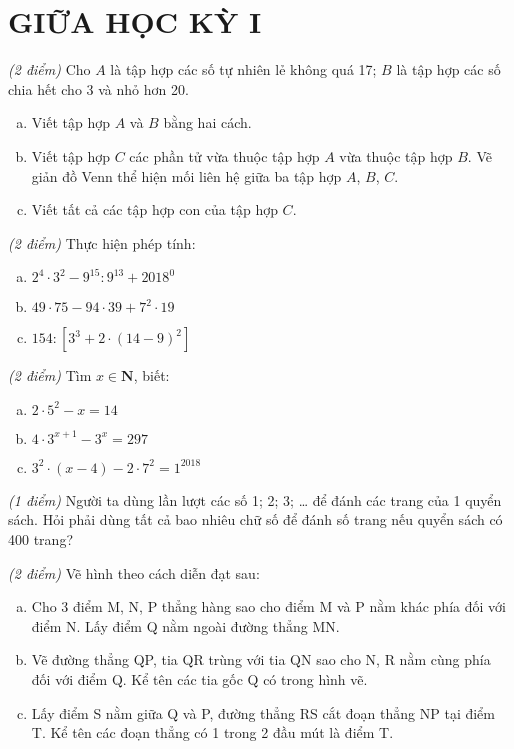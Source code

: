\section{GIỮA HỌC KỲ I}
\setcounter{ex}{0}
\begin{ex}  \textit{(2 điểm)} Cho $A$ là tập hợp các số tự nhiên lẻ không quá 17; $B$  là tập hợp các số chia hết cho 3 và nhỏ hơn 20.
\begin{enumerate} [a)]
\item Viết tập hợp $A$ và $B$ bằng hai cách.
\item Viết tập hợp $C$ các phần tử vừa thuộc tập hợp $A$ vừa thuộc tập hợp $B$. Vẽ giản đồ Venn thể hiện mối liên hệ giữa ba tập hợp $A$, $B$, $C$.
\item Viết tất cả các tập hợp con của tập hợp $C$.

\end{enumerate}
\end{ex}     \begin{ex} \textit{(2 điểm)} Thực hiện phép tính:
\begin{enumerate} [a)]
\item ${2^4} \cdot {3^2} - {9^{15}}:{ 9 ^{13}} + {2018^0}$
\item $49 \cdot 75 - 94 \cdot 39 + {7^2} \cdot 19$
\item $154:\left[ {{3^3} + 2 \cdot {{\left( {14 - 9} \right)}^2}} \right]$

\end{enumerate}
\end{ex}     \begin{ex} \textit{(2 điểm)} Tìm $x \in \mathbf{N}$, biết:
 \begin{enumerate}[a)]
\item $2 \cdot {5^2} - x = 14$
\item	$4 \cdot {3^{x + 1}} - {3^x} = 297$
\item	${3^2} \cdot \left( {x - 4} \right) - 2 \cdot {7^2} = {1^{2018}}$

\end{enumerate}
\end{ex}     \begin{ex} \textit{(1 điểm)} Người ta dùng lần lượt các số 1; 2; 3; … để đánh các trang của 1 quyển sách. Hỏi phải dùng tất cả bao nhiêu chữ số để đánh số trang nếu quyển sách có 400 trang? \\
\end{ex}     \begin{ex} \textit{(2 điểm)} Vẽ hình theo cách diễn đạt sau:
 \begin{enumerate}[a)]
\item Cho 3 điểm M, N, P thẳng hàng sao cho điểm M và P nằm khác phía đối với điểm N. Lấy điểm Q nằm ngoài đường thẳng MN.
\item	Vẽ đường thẳng QP, tia QR trùng với tia QN sao cho N, R nằm cùng phía đối với điểm Q. Kể tên các tia gốc Q có trong hình vẽ.
\item	Lấy điểm S nằm giữa Q và P, đường thẳng RS cắt đoạn thẳng NP tại điểm T. Kể tên các đoạn thẳng có 1 trong 2 đầu mút là điểm T.


\end{enumerate}
\end{ex}
